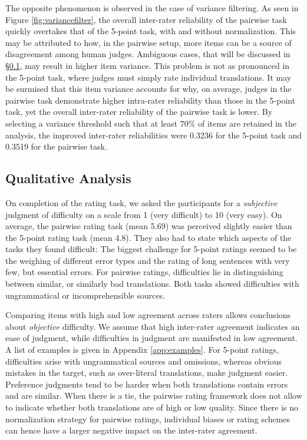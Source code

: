 The opposite phenomenon is observed in the case of variance filtering. As seen in Figure \ref{fig:variancefilter}, the overall inter-rater reliability of the pairwise task quickly overtakes that of the 5-point task, with and without normalization. This may be attributed to how, in the pairwise setup, more items can be a source of disagreement among human judges. Ambiguous cases, that will be discussed in §\ref{sec:qual},
may result in higher item variance.  This problem is not as pronounced in the 5-point task, where judges must simply rate individual translations. It may be surmised that this item variance accounts for why, on average, judges in the pairwise task demonstrate higher intra-rater reliability than those in the 5-point task, yet the overall inter-rater reliability of the pairwise task is lower. By selecting a variance threshold such that at least $70\%$ of items are retained in the analysis, the improved inter-rater reliabilities were 0.3236 for the 5-point task and 0.3519 for the pairwise task.

\subsection{Qualitative Analysis}\label{sec:qual}
On completion of the rating task, we asked the participants for a \emph{subjective} judgment of difficulty on a scale from 1 (very difficult) to 10 (very easy). On average, the pairwise rating task (mean 5.69) was perceived slightly easier than the 5-point rating task (mean 4.8). They also had to state which aspects of the tasks they found difficult: The biggest challenge for 5-point ratings seemed to be the weighing of different error types and the rating of long sentences with very few, but essential errors. For pairwise ratings, difficulties lie in distinguishing between similar, or similarly bad translations. Both tasks showed difficulties with ungrammatical or incomprehensible sources.

Comparing items with high and low agreement across raters allows conclusions about \emph{objective} difficulty. We assume that high inter-rater agreement indicates an ease of judgment, while difficulties in judgment are manifested in low agreement. A list of examples is given in Appendix \ref{app:examples}.
For 5-point ratings, difficulties arise with ungrammatical sources and omissions, whereas obvious mistakes in the target, such as over-literal translations, make judgment easier. Preference judgments tend to be harder when both translations contain errors and are similar. When there is a tie, the pairwise rating framework does not allow to indicate whether both translations are of high or low quality. Since there is no normalization strategy for pairwise ratings, individual biases or rating schemes can hence have a larger negative impact on the inter-rater agreement.

